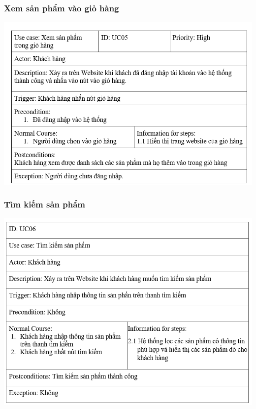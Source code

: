 \documentclass[12pt,a4paper,2sides]{report}
\begin{document}
\subsubsection{Xem sản phẩm vào giỏ hàng}
    \includegraphics[width=1\linewidth]{lib/usecase/xemsp.png}\\\vspace*{1cm}
\subsubsection{Tìm kiếm sản phẩm}
    \includegraphics[width=1\linewidth]{lib/usecase/timkiemsp.png}\\\vspace*{1cm}
\end{document}
